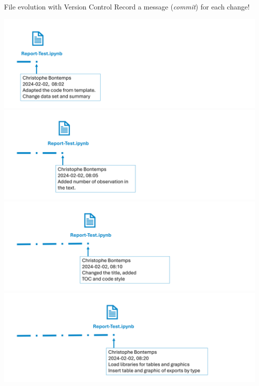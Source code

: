 \documentclass[xcolor=x11names,compress]{beamer}
\renewcommand{\(}{\begin{columns}}
\renewcommand{\)}{\end{columns}}
\newcommand{\<}[1]{\begin{column}{#1}}
\renewcommand{\>}{\end{column}}
\begin{document}
\begin{frame}{File evolution  \textcolor{brique}{with Version Control}  }
Record a message (\emph{commit})  for each change!
\begin{center}
\begin{itemize}
    {\includegraphics[width = 1.0\textwidth]{FileLife1.png} \\ }
    {\includegraphics[width = 1.0\textwidth]{FileLife2.png} \\ }
    {\includegraphics[width = 1.0\textwidth]{FileLife3.png} \\ }
    {\includegraphics[width = 1.0\textwidth]{FileLife4.png} \\ }

\end{itemize}
\end{center}
\end{frame}
\end{document}
